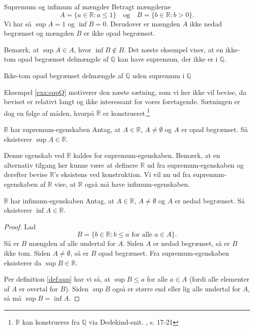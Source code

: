 \begin{example}[label=exa:supinf]{Supremum og infimum af mængder}{}
  Betragt mængderne
  \[
  A=\{ a \in \mathbb{R}:a \leq 1 \}\quad \text{og} \quad B=\{ b \in \mathbb{R}: b>0 \}. 
  \] 
  Vi har så $\sup A=1$ og $\inf B=0$.
  Derudover er mængden $A$ ikke nedad begrænset og mængden $B$ er ikke opad begrænset. 
\end{example}

Bemærk, at $\sup A \in A$, hvor $\inf B \not\in B$.
Det næste eksempel viser, at en ikke-tom opad begrænset delmængde af $\mathbb{Q}$ kan have supremum, der ikke er i $\mathbb{Q}$. 

\begin{example}[label=exa:supQ]{Ikke-tom opad begrænset delmængde af $\mathbb{Q}$ uden supremum i $\mathbb{Q}$}{}
  
\end{example}

Eksempel \ref{exa:supQ} motiverer den næste sætning, som vi her ikke vil bevise, da beviset er relativt langt og ikke interessant for vores foretagende.
Sætningen er dog en følge af måden, hvorpå $\mathbb{R}$ er konstrueret.\footnote{$\mathbb{R}$ kan konstrueres fra $\mathbb{Q}$ via Dedekind-snit. \cite{Rudin1976}, s. 17-21}

\begin{theorem}{$\mathbb{R}$ har supremum-egenskaben}{}
  Antag, at $A \in \mathbb{R}$, $A \neq \emptyset$ og $A$ er opad begrænset. 
  Så eksisterer $\sup A \in \mathbb{R}$.
\end{theorem}

Denne egenskab ved $\mathbb{R}$ kaldes for supremum-egenskaben. 
Bemærk, at en alternativ tilgang her kunne være at definere $\mathbb{R}$ ud fra supremum-egenskaben og derefter bevise $\mathbb{R}$'s eksistens ved konstruktion.
Vi vil nu ud fra supremum-egenskaben af $\mathbb{R}$ vise, at $\mathbb{R}$ også må have infimum-egenskaben. 

\begin{theorem}[label=theo:]{$\mathbb{R}$ har infimum-egenskaben  }{}
  Antag, at $A \in \mathbb{R}$, $A \neq \emptyset$ og $A$ er nedad begrænset.
  Så eksisterer $\inf A \in \mathbb{R}$.
\end{theorem}
\begin{proof} 
  Lad 
  \[
  B=\{ b \in \mathbb{R} : b \leq a \text{ for alle } a \in A \}.
  \]  
  Så er $B$ mængden af alle undertal for $A$.
  Siden $A$ er nedad begrænset, så er $B$ ikke tom.
  Siden $A \neq \emptyset$, så er $B$ opad begrænset. 
  Fra supremum-egenskaben eksisterer da $\sup B \in \mathbb{R}$. 

  Per definition \ref{def:sup} har vi så, at $\sup B \leq a$ for alle $a \in A$ (fordi alle elementer af $A$ er overtal for $B$). 
  Siden $\sup B$ også er større end eller lig alle undertal for $A$, så må $\sup B=\inf A$. 
\end{proof}

